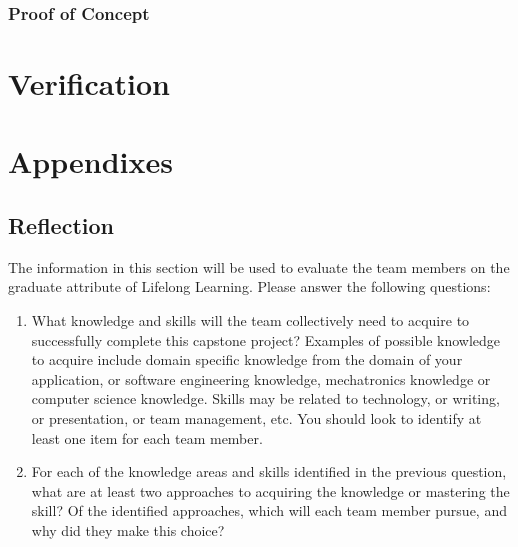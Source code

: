 \documentclass{article}
\begin{document}
\subsubsection{Proof of Concept}

\section{Verification}


\section{Appendixes}

\subsection{Reflection}

The information in this section will be used to evaluate the team members on the
graduate attribute of Lifelong Learning.  Please answer the following questions:

\begin{enumerate}
    \item What knowledge and skills will the team collectively need to acquire to
          successfully complete this capstone project?  Examples of possible knowledge
          to acquire include domain specific knowledge from the domain of your
          application, or software engineering knowledge, mechatronics knowledge or
          computer science knowledge.  Skills may be related to technology, or writing,
          or presentation, or team management, etc.  You should look to identify at
          least one item for each team member.
    \item For each of the knowledge areas and skills identified in the previous
          question, what are at least two approaches to acquiring the knowledge or
          mastering the skill?  Of the identified approaches, which will each team
          member pursue, and why did they make this choice?
\end{enumerate}
\end{document}
